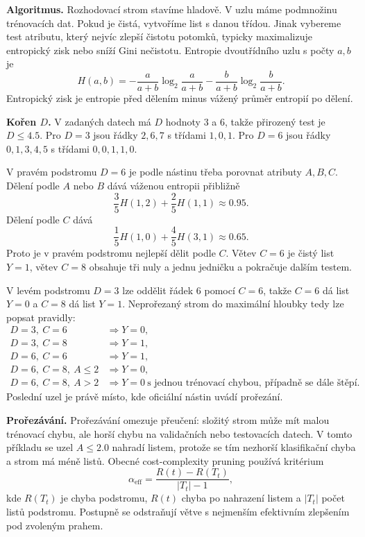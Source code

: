 \begin{odpoved}
\textbf{Algoritmus.} Rozhodovací strom stavíme hladově. V uzlu máme podmnožinu trénovacích
dat. Pokud je čistá, vytvoříme list s danou třídou. Jinak vybereme test atributu, který
nejvíc zlepší čistotu potomků, typicky maximalizuje entropický zisk nebo sníží Gini
nečistotu. Entropie dvoutřídního uzlu s počty $a,b$ je
\[
H(a,b)=-\frac{a}{a+b}\log_2\frac{a}{a+b}
-\frac{b}{a+b}\log_2\frac{b}{a+b}.
\]
Entropický zisk je entropie před dělením minus vážený průměr entropií po dělení.

\textbf{Kořen $D$.} V zadaných datech má $D$ hodnoty $3$ a $6$, takže přirozený test je
$D\le4.5$. Pro $D=3$ jsou řádky $2,6,7$ s třídami $1,0,1$. Pro $D=6$ jsou řádky
$0,1,3,4,5$ s třídami $0,0,1,1,0$.

V pravém podstromu $D=6$ je podle nástinu třeba porovnat atributy $A,B,C$. Dělení podle
$A$ nebo $B$ dává váženou entropii přibližně
\[
\frac35H(1,2)+\frac25H(1,1)\approx 0.95.
\]
Dělení podle $C$ dává
\[
\frac15H(1,0)+\frac45H(3,1)\approx 0.65.
\]
Proto je v pravém podstromu nejlepší dělit podle $C$. Větev $C=6$ je čistý list $Y=1$,
větev $C=8$ obsahuje tři nuly a jednu jedničku a pokračuje dalším testem.

V levém podstromu $D=3$ lze oddělit řádek $6$ pomocí $C=6$, takže $C=6$ dá list $Y=0$ a
$C=8$ dá list $Y=1$. Neprořezaný strom do maximální hloubky tedy lze popsat pravidly:
\[
\begin{array}{ll}
D=3,\ C=6 &\Rightarrow Y=0,\\
D=3,\ C=8 &\Rightarrow Y=1,\\
D=6,\ C=6 &\Rightarrow Y=1,\\
D=6,\ C=8,\ A\le2 &\Rightarrow Y=0,\\
D=6,\ C=8,\ A>2 &\Rightarrow Y=0\ \text{s jednou trénovací chybou, případně se dále štěpí.}
\end{array}
\]
Poslední uzel je právě místo, kde oficiální nástin uvádí prořezání.

\textbf{Prořezávání.} Prořezávání omezuje přeučení: složitý strom může mít malou trénovací
chybu, ale horší chybu na validačních nebo testovacích datech. V tomto příkladu se uzel
$A\le2.0$ nahradí listem, protože se tím nezhorší klasifikační chyba a strom má méně listů.
Obecné cost-complexity pruning používá kritérium
\[
\alpha_{\mathrm{eff}}=\frac{R(t)-R(T_t)}{|T_t|-1},
\]
kde $R(T_t)$ je chyba podstromu, $R(t)$ chyba po nahrazení listem a $|T_t|$ počet listů
podstromu. Postupně se odstraňují větve s nejmenším efektivním zlepšením pod zvoleným
prahem.
\end{odpoved}

